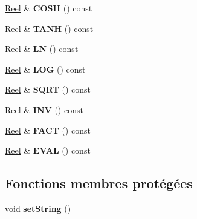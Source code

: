 \begin{DoxyCompactItemize}
\item 
\hypertarget{classcalcul_1_1_reel_a1c302e4b68d9e617024cdb4cb26205c5}{\hyperlink{classcalcul_1_1_reel}{Reel} \& {\bfseries C\-O\-S\-H} () const }\label{classcalcul_1_1_reel_a1c302e4b68d9e617024cdb4cb26205c5}

\item 
\hypertarget{classcalcul_1_1_reel_a84d981dad734ac55b0de24876c210c6b}{\hyperlink{classcalcul_1_1_reel}{Reel} \& {\bfseries T\-A\-N\-H} () const }\label{classcalcul_1_1_reel_a84d981dad734ac55b0de24876c210c6b}

\item 
\hypertarget{classcalcul_1_1_reel_a5fa6c5d205b852093157f1f86cd4bb68}{\hyperlink{classcalcul_1_1_reel}{Reel} \& {\bfseries L\-N} () const }\label{classcalcul_1_1_reel_a5fa6c5d205b852093157f1f86cd4bb68}

\item 
\hypertarget{classcalcul_1_1_reel_ac22982827f92a9c044e8b0a5e594929e}{\hyperlink{classcalcul_1_1_reel}{Reel} \& {\bfseries L\-O\-G} () const }\label{classcalcul_1_1_reel_ac22982827f92a9c044e8b0a5e594929e}

\item 
\hypertarget{classcalcul_1_1_reel_a4afb261cb350db25f692bc39d8645c69}{\hyperlink{classcalcul_1_1_reel}{Reel} \& {\bfseries S\-Q\-R\-T} () const }\label{classcalcul_1_1_reel_a4afb261cb350db25f692bc39d8645c69}

\item 
\hypertarget{classcalcul_1_1_reel_ac704df6ace45a561847e3a881768614b}{\hyperlink{classcalcul_1_1_reel}{Reel} \& {\bfseries I\-N\-V} () const }\label{classcalcul_1_1_reel_ac704df6ace45a561847e3a881768614b}

\item 
\hypertarget{classcalcul_1_1_reel_ae370422a6024657880a5f650f668c91f}{\hyperlink{classcalcul_1_1_reel}{Reel} \& {\bfseries F\-A\-C\-T} () const }\label{classcalcul_1_1_reel_ae370422a6024657880a5f650f668c91f}

\item 
\hypertarget{classcalcul_1_1_reel_afce90d98cc806db427d2561b949de170}{\hyperlink{classcalcul_1_1_reel}{Reel} \& {\bfseries E\-V\-A\-L} () const }\label{classcalcul_1_1_reel_afce90d98cc806db427d2561b949de170}

\end{DoxyCompactItemize}
\subsection*{Fonctions membres protégées}
\begin{DoxyCompactItemize}
\item 
\hypertarget{classcalcul_1_1_reel_a667dde4c69dee28d6de312fa2a1411b6}{void {\bfseries set\-String} ()}\label{classcalcul_1_1_reel_a667dde4c69dee28d6de312fa2a1411b6}

\end{DoxyCompactItemize}
